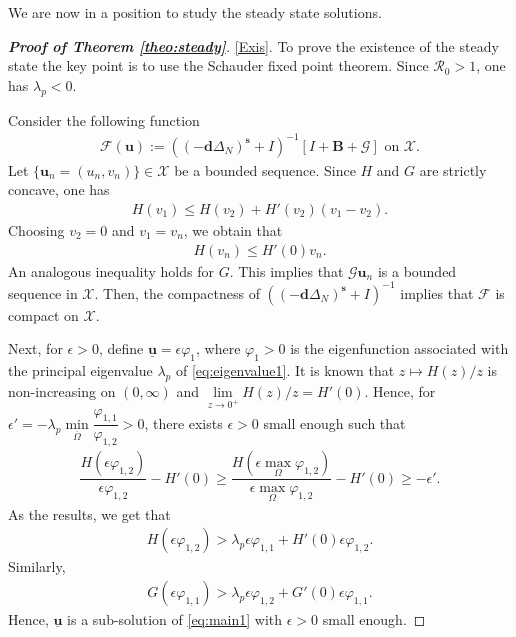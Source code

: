 \documentclass[a4paper,11pt]{amsart}
\theoremstyle{definition}
\def\O{\Omega}
\numberwithin{equation}{section}
\theoremstyle{definition}
\def\O{\Omega}
\begin{document}
We are now in a position to study the steady state solutions.








\begin{proof}[\bf Proof of Theorem \ref{theo:steady}]





\ref{Exis}. To prove the existence of the steady state the key point is to use the Schauder fixed point theorem. Since $\mathcal{R}_0>1$, one has $\lambda_p<0$.

Consider the following function 
\begin{align*}
\mathcal{F}(\textbf{u}):=((-\textbf{d}\Delta_N)^{\textbf{s}}+I)^{-1}[I+ \textbf{B}+\mathcal{G}] \text{ on }  \mathcal{X}.
\end{align*}
 Let $\{\textbf{u}_n=(u_n,v_n)\}\in \mathcal{X}$ be a bounded sequence. Since $H$ and $G$ are strictly concave, one has
\begin{align*}
H(v_1)\leq H(v_2)+H'(v_2)(v_1-v_2).
\end{align*}
Choosing $v_2=0$ and $v_1 =v_n$, we obtain that 
\begin{align*}
H(v_n)\leq H'(0)v_n.
\end{align*}
An analogous inequality holds for $G$. This implies that $\mathcal{G}\textbf{u}_n$ is a bounded sequence in $\mathcal{X}$. Then, the compactness of $((-\textbf{d}\Delta_N)^{\textbf{s}}+I)^{-1}$ implies that $\mathcal{F}$ is compact on $\mathcal{X}$.

Next, for $\epsilon>0$, define $\underline{\textbf{u}}=\epsilon \varphi_1$, where $\varphi_1>0$ is the eigenfunction associated with the principal  eigenvalue $\lambda_p$ of \eqref{eq:eigenvalue1}. It is known that $z\mapsto H(z)/z$ is non-increasing on $(0,\infty)$ and $\lim\limits_{z\rightarrow 0^+} H(z)/z=H'(0)$. Hence, for $\epsilon'=-\lambda_p \min\limits_{\overline{\O}}\dfrac{\varphi_{1,1}}{\varphi_{1,2}}>0$, there exists $\epsilon>0$ small enough such that
\begin{align*}
\dfrac{H(\epsilon\varphi_{1,2})}{\epsilon\varphi_{1,2}}-H'(0)\geq \dfrac{H\left(\epsilon\max\limits_{\O}\varphi_{1,2}\right)}{\epsilon\max\limits_{\O}\varphi_{1,2}}-H'(0)\geq -\epsilon'.
\end{align*}
As the results, we get that
\begin{align*}
H(\epsilon\varphi_{1,2}) >\lambda_p \epsilon\varphi_{1,1} + H'(0)\epsilon\varphi_{1,2}.
\end{align*}
Similarly,
\begin{align*}
G(\epsilon\varphi_{1,1}) >\lambda_p \epsilon\varphi_{1,2} + G'(0)\epsilon\varphi_{1,1}.
\end{align*}
Hence, $\underline{\textbf{u}}$ is a sub-solution of \eqref{eq:main1} with $\epsilon>0$ small enough. 


\end{proof}
\end{document}
